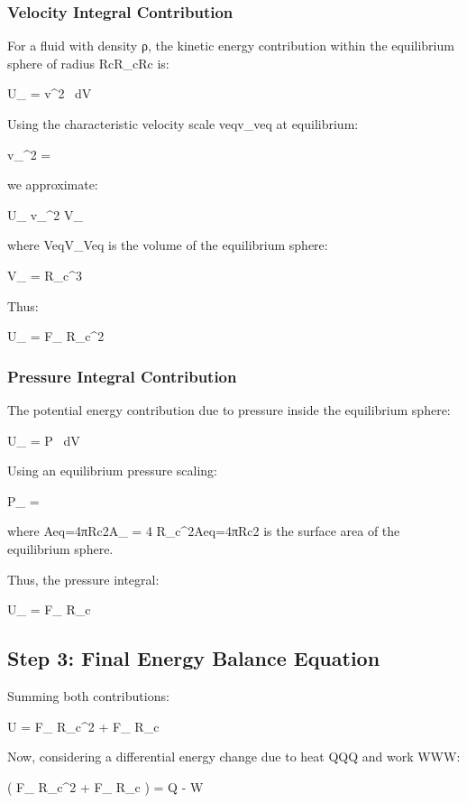 \subsubsection*{Velocity Integral Contribution}
For a fluid with density ρ, the kinetic energy contribution within the equilibrium sphere of radius RcR_cRc is:

U_ =  \rho \int v^2 \, dV

Using the characteristic velocity scale veqv_veq at equilibrium:

v_^2 = 

we approximate:

U_ \approx {} \rho v_^2 \cdot V_

where VeqV_Veq is the volume of the equilibrium sphere:

V_ =  \pi R_c^3

Thus:

U_ =  \pi F_{\max} R_c^2



\subsubsection*{Pressure Integral Contribution}
The potential energy contribution due to pressure inside the equilibrium sphere:

U_ = \int P \, dV

Using an equilibrium pressure scaling:

P_ = 

where Aeq=4πRc2A_ = 4 \pi R_c^2Aeq=4πRc2 is the surface area of the equilibrium sphere.

Thus, the pressure integral:

U_ =  F_{\max} R_c



\subsection*{Step 3: Final Energy Balance Equation}
Summing both contributions:

U =  \pi F_{\max} R_c^2 +  F_{\max} R_c

Now, considering a differential energy change due to heat QQQ and work WWW:

\Delta \left(  \pi F_{\max} R_c^2 +  F_{\max} R_c \right) = Q - W

